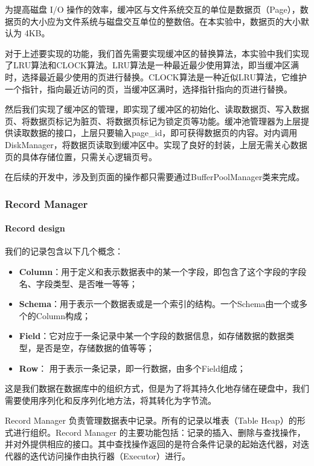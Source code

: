 \documentclass[12pt,hyperref,a4paper,UTF8]{ctexart}
\begin{document}
为提高磁盘 I/O 操作的效率，缓冲区与文件系统交互的单位是数据页（Page），数据页的大小应为文件系统与磁盘交互单位的整数倍。在本实验中，数据页的大小默认为 4KB。

对于上述要实现的功能，我们首先需要实现缓冲区的替换算法，本实验中我们实现了LRU算法和CLOCK算法。LRU算法是一种最近最少使用算法，即当缓冲区满时，选择最近最少使用的页进行替换。CLOCK算法是一种近似LRU算法，它维护一个指针，指向最近访问的页，当缓冲区满时，选择指针指向的页进行替换。

然后我们实现了缓冲区的管理，即实现了缓冲区的初始化、读取数据页、写入数据页、将数据页标记为脏页、将数据页标记为锁定页等功能。缓冲池管理器为上层提供读取数据的接口，上层只要输入page\_id，即可获得数据页的内容。对内调用DiskManager，将数据页读取到缓冲区中。实现了良好的封装，上层无需关心数据页的具体存储位置，只需关心逻辑页号。

在后续的开发中，涉及到页面的操作都只需要通过BufferPoolManager类来完成。

\subsubsection{Record Manager}

\paragraph{Record design}
我们的记录包含以下几个概念：

\begin{itemize}
    \item \textbf{Column}：用于定义和表示数据表中的某一个字段，即包含了这个字段的字段名、字段类型、是否唯一等等；
    \item \textbf{Schema}：用于表示一个数据表或是一个索引的结构。一个Schema由一个或多个的Column构成；
    \item \textbf{Field}：它对应于一条记录中某一个字段的数据信息，如存储数据的数据类型，是否是空，存储数据的值等等；
    \item \textbf{Row}： 用于表示一条记录，即一行数据，由多个Field组成；
\end{itemize}

这是我们数据在数据库中的组织方式，但是为了将其持久化地存储在硬盘中，我们需要使用序列化和反序列化地方法，将其转化为字节流。

Record Manager 负责管理数据表中记录。所有的记录以堆表（Table Heap）的形式进行组织。Record Manager 的主要功能包括：记录的插入、删除与查找操作，并对外提供相应的接口。其中查找操作返回的是符合条件记录的起始迭代器，对迭代器的迭代访问操作由执行器（Executor）进行。
\end{document}
